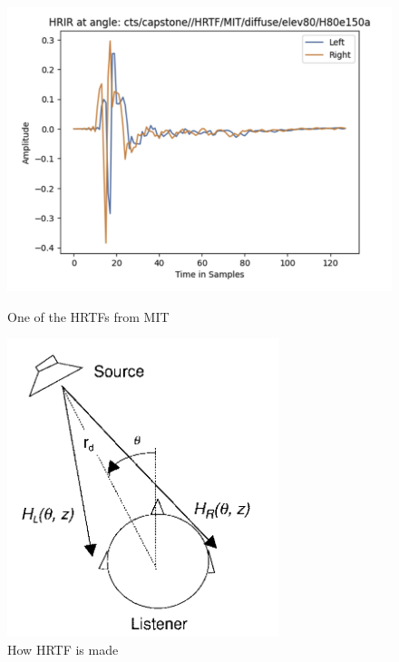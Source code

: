 \documentclass[12pt,a4paper]{article}
\begin{document}
\begin{figure}[ht!]
    \centering
    \begin{minipage}[t]{0.55\textwidth}
        \centering
        \includegraphics[width=\textwidth]{HRTF_func.png}
        \caption{One of the HRTFs from MIT}
        \label{HRTF}
    \end{minipage}%
    \hfill
    \begin{minipage}[t]{0.4\textwidth}
        \centering
        \includegraphics[width=\textwidth]{HRTF_man.png}
        \caption{How HRTF is made}
        \label{HRTF_diag}
    \end{minipage}
\end{figure}
\end{document}
